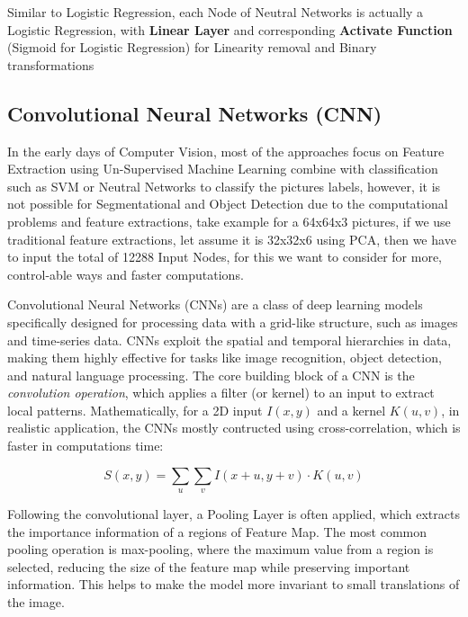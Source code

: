 Similar to Logistic Regression, each Node of Neutral Networks is actually a Logistic Regression, with \textbf{Linear Layer} and corresponding \textbf{Activate Function} (Sigmoid for Logistic Regression) for Linearity removal and Binary transformations



\subsection{Convolutional Neural Networks (CNN)}

In the early days of Computer Vision, most of the approaches focus on Feature Extraction using Un-Supervised Machine Learning combine with   classification such as SVM or Neutral Networks to classify the pictures labels, however, it is not possible for Segmentational and Object Detection due to the computational problems and feature extractions, take example for a 64x64x3 pictures, if we use traditional feature extractions, let assume it is 32x32x6 using PCA, then we have to input the total of 12288 Input Nodes, for this we want to consider for more, control-able ways and faster computations.

Convolutional Neural Networks (CNNs) are a class of deep learning models specifically designed for processing data with a grid-like structure, such as images and time-series data. CNNs exploit the spatial and temporal hierarchies in data, making them highly effective for tasks like image recognition, object detection, and natural language processing. The core building block of a CNN is the \textit{convolution operation}, which applies a filter (or kernel) to an input to extract local patterns. Mathematically, for a 2D input \( I(x, y) \) and a kernel \( K(u, v) \),  in realistic application, the CNNs mostly contructed using cross-correlation, which is faster in computations time:

\[
S(x, y) = \sum_{u}\sum_{v} I(x + u, y + v) \cdot K(u, v)
\]

Following the convolutional layer, a Pooling Layer is often applied, which extracts the importance information of a regions of Feature Map. The most common pooling operation is max-pooling, where the maximum value from a region is selected, reducing the size of the feature map while preserving important information. This helps to make the model more invariant to small translations of the image.

